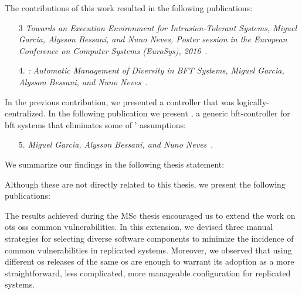 The contributions of this work resulted in the following publications:

\begin{enumerate}

\item[3] \emph{Towards an Execution Environment for Intrusion-Tolerant Systems, Miguel Garcia, Alysson Bessani, and Nuno Neves, Poster session in the European Conference on Computer Systems (EuroSys), 2016}~\cite{Garcia:2016b}.


\item[4.] \emph{\system: Automatic Management of Diversity in BFT Systems, Miguel Garcia, Alysson Bessani, and Nuno Neves}~\cite{}.

\end{enumerate}


In the previous contribution, we presented a controller that was logically-centralized. 
In the following publication we present \controller, a generic \gls{bft}-controller for \gls{bft} systems that eliminates some of \system' assumptions:


\begin{enumerate}

\item[5.] \emph{\controller Miguel Garcia, Alysson Bessani, and Nuno Neves}~\cite{}.

\end{enumerate}

We summarize our findings in the following thesis statement:


\vspace{2mm}


Although these are not directly related to this thesis, we present the following publications:

The results achieved during the MSc thesis encouraged us to extend the work on \gls{ots} \glspl{os} common vulnerabilities.
In this extension, we devised three manual strategies for selecting diverse software components to minimize the incidence of common vulnerabilities in replicated systems.
Moreover, we observed that using different \gls{os} releases of the same \gls{os} are enough to warrant its adoption as a more straightforward, less complicated, more manageable configuration for replicated systems.

